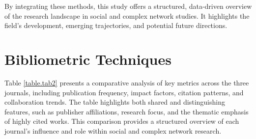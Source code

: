 \documentclass[twocolumn]{article}
\begin{document}
	By integrating these methods, this study offers a structured, data-driven overview of the research landscape in social and complex network studies. It highlights the field's development, emerging trajectories, and potential future directions.
	
	
	
	
	\section{Bibliometric Techniques}\label{Bibliometric Techniques}
	
	Table \ref{table.tab2} presents a comparative analysis of key metrics across the three journals, including publication frequency, impact factors, citation patterns, and collaboration trends\cite{donthu2021bibliometric}. The table highlights both shared and distinguishing features, such as publisher affiliations, research focus, and the thematic emphasis of highly cited works. This comparison provides a structured overview of each journal’s influence and role within social and complex network research\cite{ WOS:000356343600002}.
	
\end{document}
